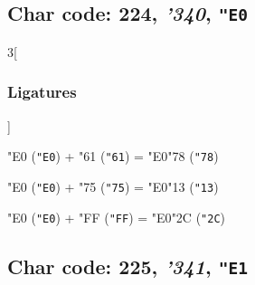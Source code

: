 \documentclass{article}
\newlength{\maxcharwidth}
\begin{document}
\subsection{Char code: 224, {\it'340}, {\tt"E0}}
\label{char_224}


\begin{multicols}{3}[\subsubsection{Ligatures}]

{\testfont\char"E0\noboundary} ({\tt"E0}) + {\testfont\char"61\noboundary} ({\tt"61}) = {\testfont\char"E0\noboundary}{\testfont\char"78\noboundary} ({\tt"78}) 

{\testfont\char"E0\noboundary} ({\tt"E0}) + {\testfont\char"75\noboundary} ({\tt"75}) = {\testfont\char"E0\noboundary}{\testfont\char"13\noboundary} ({\tt"13}) 

{\testfont\char"E0\noboundary} ({\tt"E0}) + {\testfont\char"FF\noboundary} ({\tt"FF}) = {\testfont\char"E0\noboundary}{\testfont\char"2C\noboundary} ({\tt"2C}) 

\end{multicols}

\subsection{Char code: 225, {\it'341}, {\tt"E1}}
\label{char_225}

\end{document}
